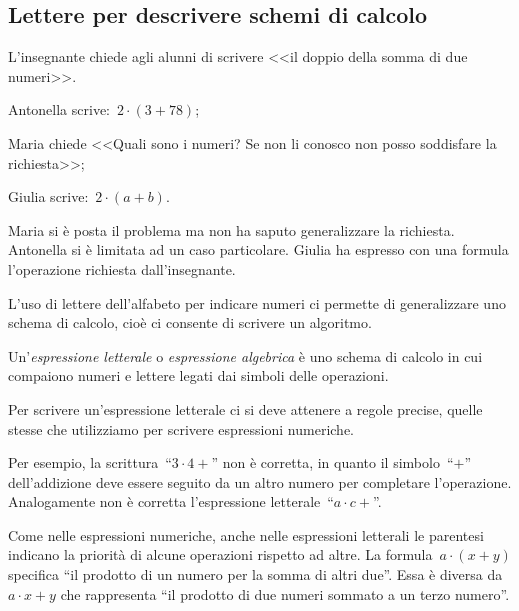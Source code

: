 \subsection{Lettere per descrivere schemi di calcolo}
\begin{exrig}
 \begin{esempio}
 L'insegnante chiede agli alunni di scrivere <<il doppio della somma di due numeri>>.

\begin{itemize*}
\item Antonella scrive:~$2\cdot (3+78)$;
\item Maria chiede <<Quali sono i numeri? Se non li conosco non posso soddisfare la richiesta>>;
\item Giulia scrive:~$2\cdot (a+b)$.
\end{itemize*}
Maria si è posta il problema ma non ha saputo generalizzare la richiesta. Antonella si è limitata ad un caso
particolare. Giulia ha espresso con una formula l'operazione richiesta dall'insegnante.
 \end{esempio}
\end{exrig}

\osservazione L'uso di lettere dell'alfabeto per indicare numeri ci permette di generalizzare uno schema di calcolo, cioè ci consente di scrivere un algoritmo.

\begin{definizione}
 Un'\emph{espressione letterale} o \emph{espressione algebrica} è uno schema di calcolo in cui compaiono numeri e lettere
legati dai simboli delle operazioni.
\end{definizione}

Per scrivere un'espressione letterale ci si deve attenere a regole precise, quelle stesse che utilizziamo per scrivere
espressioni numeriche.

Per esempio, la scrittura~``$3\cdot 4+$'' non è corretta, in quanto il simbolo~``$+$'' dell'addizione deve essere seguito da un
altro numero per completare l'operazione. Analogamente non è corretta l'espressione letterale~``$a\cdot c+$''.

Come nelle espressioni numeriche, anche nelle espressioni letterali le parentesi indicano la priorità di alcune operazioni rispetto ad altre.
La formula~$a\cdot (x+y)$ specifica ``il prodotto di un numero per la somma di altri due''. Essa è diversa da  $a\cdot x+y$
che rappresenta ``il prodotto di due numeri sommato a un terzo numero''.

\vspazio\ovalbox{\risolvii \ref{ese:8.2}, \ref{ese:8.3}, \ref{ese:8.4}}


